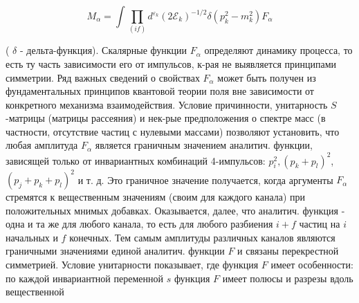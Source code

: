 \documentclass[10pt]{article}
\begin{document}
\[

M_{\alpha}=\int \prod_{(i f)} d^{\varepsilon_{k}}\left(2 \mathscr{E}_{k}\right)^{-1 / 2} \delta\left(p_{k}^{2}-m_{k}^{2}\right) F_{\alpha}

\]



( $\delta$ - дельта-функция). Скалярные функции $F_{\alpha}$ определяют динамику процесса, то есть ту часть зависимости его от импульсов, к-рая не выявляется принципами симметрии. Ряд важных сведений о свойствах $F_{\alpha}$ может быть получен из фундаментальных принципов квантовой теории поля вне зависимости от конкретного механизма взаимодействия. Условие причинности, унитарность $S$-матрицы (матрицы рассеяния) и нек-рые предположения о спектре масс (в частности, отсутствие частиц с нулевыми массами) позволяют установить, что любая амплитуда $F_{\alpha}$ является граничным значением аналитич. функции, зависящей только от инвариантных комбинаций 4-импульсов: $p_{i}^{2},\left(p_{k}+p_{l}\right)^{2}$, $\left(p_{j}+p_{k}+p_{l}\right)^{2}$ и т. д. Это граничное значение получается, когда аргументы $F_{\alpha}$ стремятся к вещественным значениям (своим для каждого канала) при положительных мнимых добавках. Оказывается, далее, что аналитич. функция - одна и та же для любого канала, то есть для любого разбиения $i+f$ частиц на $i$ начальных и $f$ конечных. Тем самым амплитуды различных каналов являются граничными значениями единой аналитич. функции $F$ и связаны перекрестной симметрией. Условие унитарности показывает, где функция $F$ имеет особенности: по каждой инвариантной переменной $s$ функция $F$ имеет полюсы и разрезы вдоль вещественной
\end{document}
